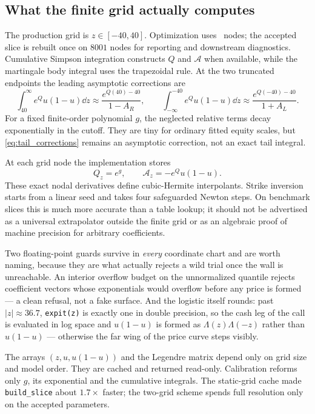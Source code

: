 \documentclass[11pt]{article}
\begin{document}
\subsection{What the finite grid actually computes}
\label{sec:numerics}

The production grid is $z\in[-40,40]$.  Optimization uses \lqdoptpts\ nodes;
the accepted slice is rebuilt once on $8001$ nodes for reporting and downstream
diagnostics.  Cumulative Simpson integration constructs $Q$ and $\mathcal A$
when available, while the martingale body integral uses the trapezoidal rule.
At the two truncated endpoints the leading asymptotic corrections are
\begin{equation}
\int_{40}^{\infty} e^Q u(1-u)\dd z
\approx\frac{e^{Q(40)-40}}{1-A_R},
\qquad
\int_{-\infty}^{-40} e^Q u(1-u)\dd z
\approx\frac{e^{Q(-40)-40}}{1+A_L}.
\label{eq:tail_corrections}
\end{equation}
For a fixed finite-order polynomial $g$, the neglected relative terms decay
exponentially in the cutoff.  They are tiny for ordinary fitted equity scales,
but \eqref{eq:tail_corrections} remains an asymptotic correction, not an exact
tail integral.

At each grid node the implementation stores
\[
Q_z=e^g,\qquad
\mathcal A_z=-e^Q u(1-u).
\]
These exact nodal derivatives define cubic-Hermite interpolants.  Strike
inversion starts from a linear seed and takes four safeguarded Newton steps.
On benchmark slices this is much more accurate than a table lookup; it should
not be advertised as a universal extrapolator outside the finite grid or as an
algebraic proof of machine precision for arbitrary coefficients.

Two floating-point guards survive in \emph{every} coordinate chart and are
worth naming, because they are what actually rejects a wild trial once the
wall is unreachable.  An interior overflow budget on the unnormalized
quantile rejects coefficient vectors whose exponentials would overflow
before any price is formed --- a clean refusal, not a fake surface.  And the
logistic itself rounds: past $|z|\approx36.7$, \texttt{expit(z)} is exactly
one in double precision, so the cash leg of the call is evaluated in log
space and $u(1-u)$ is formed as $\Lambda(z)\Lambda(-z)$ rather than
$u(1-u)$ --- otherwise the far wing of the price curve steps visibly.

\begin{perfbox}
The arrays $(z,u,u(1-u))$ and the Legendre matrix depend only on grid size and
model order.  They are cached and returned read-only.  Calibration reforms only
$g$, its exponential and the cumulative integrals.  The static-grid cache made
\texttt{build\_slice} about $1.7\times$ faster; the two-grid scheme spends full
resolution only on the accepted parameters.
\end{perfbox}
\end{document}
